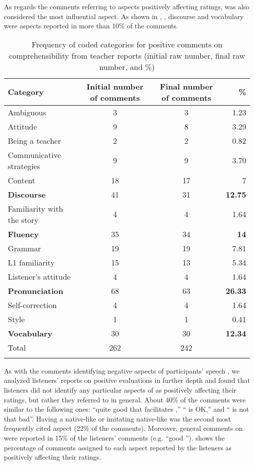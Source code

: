 \documentclass[output=paper]{langsci/langscibook}
\begin{document}
As regards the comments referring to aspects positively affecting  ratings,  was also considered the most influential aspect. As shown in , , discourse and vocabulary were aspects reported in more than 10\% of the comments.

\begin{table}
\caption{Frequency of coded categories for positive comments on comprehensibility from teacher reports (initial raw number, final raw number, and \%)}
\label{tab:delrio:5}

\begin{tabularx}{\textwidth}{lSSr}
\lsptoprule
\bfseries Category & \bfseries Initial number of comments & \bfseries Final number of comments & \bfseries \%\\
\midrule
Ambiguous & 3 & 3 & 1.23\\
Attitude & 9 & 8 & 3.29\\
Being a teacher & 2 & 2 & 0.82\\
Communicative strategies & 9 & 9 & 3.70\\
Content & 18 & 17 & 7\\
\textbf{Discourse} & 41 & 31 & \textbf{12.75}\\
Familiarity with the story & 4 & 4 & 1.64\\
\textbf{Fluency} & 35 & 34 & \textbf{14}\\
Grammar & 19 & 19 & 7.81\\
L1 familiarity & 15 & 13 & 5.34\\
Listener’s attitude & 4 & 4 & 1.64\\
\textbf{Pronunciation} & 68 & 63 & \textbf{26.33}\\
Self-correction & 4 & 4 & 1.64\\
Style & 1 & 1 & 0.41\\
\textbf{Vocabulary} & 30 & 30 & \textbf{12.34}\\
\midrule 
Total & 262 & 242 & \\
\lspbottomrule
\end{tabularx}
\end{table}

As with the  comments identifying negative aspects of participants’ speech , we analyzed listeners’ reports on positive evaluations in further depth and found that listeners did not identify any particular aspects of  as positively affecting their  ratings, but rather they referred to  in general. About 40\% of the comments were similar to the following ones: “quite good  that facilitates ,” “ is OK,” and “ is not that bad”. Having a native-like  or imitating native-like  was the second most frequently cited aspect (22\% of the comments). Moreover, general comments on  were reported in 15\% of the listeners’ comments (e.g. “good ”).  shows the percentage of comments assigned to each  aspect reported by the listeners as positively affecting their  ratings.
\end{document}
